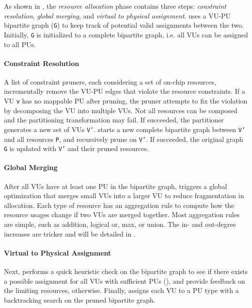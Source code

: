 As shown in , the \emph{resource allocation} phase contains three steps:
\emph{constraint resolution}, \emph{global merging}, and \emph{virtual to physical assignment}.
\name uses a VU-PU bipartite graph (\texttt{G}) to keep track of potential valid assignments between the two.
Initially, \texttt{G} is initialized to a complete bipartite graph, i.e. all VUs can be assigned to
all PUs.

\paragraph{Constraint Resolution}
A list of constraint pruners, each considering a set of on-chip resources, 
incrementally remove the VU-PU edges that violate the resource constraints.
If a VU \texttt{v} has no mappable PU after pruning, the pruner attempts to fix the violation by
decomposing the VU into multiple VUs. 
Not all resources can be composed and the partitioning transformation may fail.
If succeeded, the partitioner generates a new set of VUs \texttt{V'}. \name starts a new complete bipartite
graph between \texttt{V'} and all resources \texttt{P}, and recursively prune on \texttt{V'}.
If succeeded, the original graph \texttt{G} is updated with \texttt{V'} and their pruned resources.

\paragraph{Global Merging}
After all VUs have at least one PU in the bipartite graph, \name triggers a global optimization that merges 
small VUs into a larger VU to reduce fragmentation in allocation.
Each type of resource has an aggregation rule to compute how the resource usages change if two VUs are merged
together. Most aggregation rules are simple, such as addition, logical or, max, or union.
The in- and out-degree increases are tricker and will be detailed in .

\paragraph{Virtual to Physical Assignment}
Next, \name performs a quick heuristic check on the bipartite graph to see if there exists a
possible assignment for all VUs with sufficient PUs (), and provide feedback on the
limiting resources, otherwise.
Finally, \name assigns each VU to a PU type with a backtracking search on the pruned bipartite
graph.

